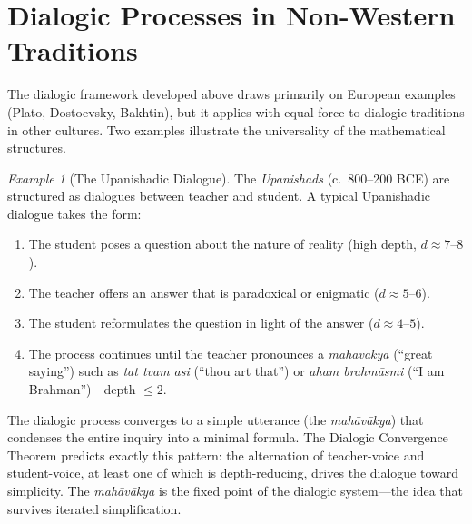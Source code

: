 \documentclass[11pt,openany]{book}
\theoremstyle{definition}
\theoremstyle{plain}
\theoremstyle{remark}
\newtheorem{example}[axiom]{Example}
\begin{document}
\section{Dialogic Processes in Non-Western Traditions}

The dialogic framework developed above draws primarily on European examples (Plato, Dostoevsky, Bakhtin), but it applies with equal force to dialogic traditions in other cultures. Two examples illustrate the universality of the mathematical structures.

\begin{example}[The Upanishadic Dialogue]
The \emph{Upanishads} (c.~800--200 BCE) are structured as dialogues between teacher and student. A typical Upanishadic dialogue takes the form:
\begin{enumerate}
\item The student poses a question about the nature of reality (high depth, $d \approx 7$--$8$).
\item The teacher offers an answer that is paradoxical or enigmatic ($d \approx 5$--$6$).
\item The student reformulates the question in light of the answer ($d \approx 4$--$5$).
\item The process continues until the teacher pronounces a \emph{mahāvākya} (``great saying'') such as \textit{tat tvam asi} (``thou art that'') or \textit{aham brahmāsmi} (``I am Brahman'')---depth $\leq 2$.
\end{enumerate}

The dialogic process converges to a simple utterance (the \emph{mahāvākya}) that condenses the entire inquiry into a minimal formula. The Dialogic Convergence Theorem predicts exactly this pattern: the alternation of teacher-voice and student-voice, at least one of which is depth-reducing, drives the dialogue toward simplicity. The \emph{mahāvākya} is the fixed point of the dialogic system---the idea that survives iterated simplification.
\end{example}
\end{document}
